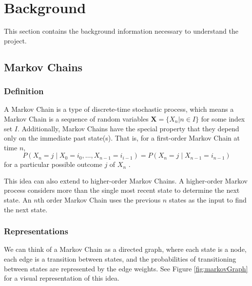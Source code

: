 \chapter{Background} \label{bg}

This section contains the background information necessary to understand the project.

\section[Markov Chains]{Markov Chains} \label{bg:markov}

\subsection{Definition} \label{bg:markov:definitions}

A Markov Chain is a type of discrete-time stochastic process, which means a Markov Chain is a sequence of random variables $\boldsymbol{X} = \{X_{n} | n \in I\}$ for some index set $I$.
Additionally, Markov Chains have the special property that they depend only on the immediate past state(s).
That is, for a first-order Markov Chain at time $n$, $$P(X_{n} = j \mid X_{0} = i_{0}, \ldots, X_{n - 1} = i_{i - 1}) = P(X_{n} = j \mid X_{n - 1} = i_{n - 1})$$ for a particular possible outcome $j$ of $X_{n}$ \cite{nierhaus_algorithmic_2009}.

This idea can also extend to higher-order Markov Chains.
A higher-order Markov process considers more than the single most recent state to determine the next state.
An $n$th order Markov Chain uses the previous $n$ states as the input to find the next state.

\subsection{Representations} \label{bg:markov:representations}

We can think of a Markov Chain as a directed graph, where each state is a node, each edge is a transition between states, and the probabilities of transitioning between states are represented by the edge weights.
See Figure \ref{fig:markovGraph} for a visual representation of this idea.

